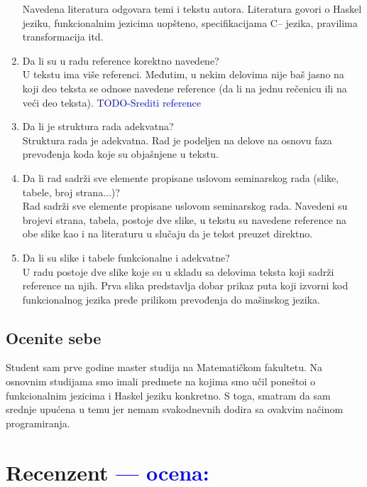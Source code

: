 \documentclass[a4paper]{report}
\newcommand{\odgovor}[1]{\textcolor{blue}{#1}}
\begin{document}
\begin{enumerate}
		Navedena literatura odgovara temi i tekstu autora. Literatura govori o Haskel jeziku, funkcionalnim jezicima uopšteno, specifikacijama C-- jezika, pravilima transformacija itd. 
		\item Da li su u radu reference korektno navedene?\\
		U tekstu ima više referenci. Međutim, u nekim delovima nije baš jasno na koji deo teksta se odnose navedene reference (da li na jednu rečenicu ili na veći deo teksta).
		\odgovor{TODO-Srediti reference}
		\item Da li je struktura rada adekvatna?\\
		Struktura rada je adekvatna. Rad je podeljen na delove na osnovu faza prevođenja koda koje su objašnjene u tekstu.
		\item Da li rad sadrži sve elemente propisane uslovom seminarskog rada (slike, tabele, broj strana...)?\\
		Rad sadrži sve elemente propisane uslovom seminarskog rada. Navedeni su brojevi strana, tabela, postoje dve slike, u tekstu su navedene reference na obe slike kao i na literaturu u slučaju da je tekst preuzet direktno.
		\item Da li su slike i tabele funkcionalne i adekvatne?\\
		U radu postoje dve slike koje su u skladu sa delovima teksta koji sadrži reference na njih. Prva slika predstavlja dobar prikaz puta koji izvorni kod funkcionalnog jezika pređe prilikom prevođenja do mašinskog jezika.
	\end{enumerate}
	
	\section{Ocenite sebe}
	Student sam prve godine master studija na Matematičkom fakultetu. Na osnovnim studijama smo imali predmete na kojima smo učil poneštoi o funkcionalnim jezicima i Haskel jeziku konkretno. S toga, smatram da sam srednje upućena u temu jer nemam svakodnevnih dodira sa ovakvim načinom programiranja.
	
	
	\chapter{Recenzent \odgovor{--- ocena:} }
	
\end{document}
